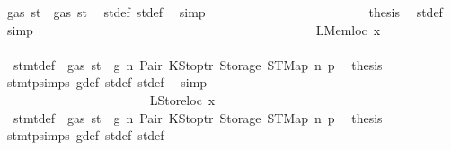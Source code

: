 \begin{isabellebody}
\ {\isachardoublequoteopen}gas\ st{\isacharprime}{\kern0pt}{\isacharprime}{\kern0pt}\ {\isasymle}\ gas\ st{\isacharprime}{\kern0pt}{\isachardoublequoteclose}\ \isamarkupfalse%
\ st{\isacharprime}{\kern0pt}{\isacharunderscore}{\kern0pt}def\ st{\isacharprime}{\kern0pt}{\isacharprime}{\kern0pt}{\isacharunderscore}{\kern0pt}def\ \isamarkupfalse%
\ simp\isanewline
\ \ \ \ \ \ \ \ \ \ \ \ \ \ \ \ \ \ \ \ \ \ \isamarkupfalse%
\ \isamarkupfalse%
\ {\isacharquery}{\kern0pt}thesis\ \isamarkupfalse%
\ st{\isacharprime}{\kern0pt}{\isacharunderscore}{\kern0pt}def\ \isamarkupfalse%
\ simp\isanewline
\ \ \ \ \ \ \ \ \ \ \ \ \ \ \ \ \ \ \ \ \isamarkupfalse%
\isanewline
\ \ \ \ \ \ \ \ \ \ \ \ \ \ \ \ \ \ \ \ \ \ \isamarkupfalse%
\ {\isacharparenleft}{\kern0pt}LMemloc\ x{}{\isacharparenright}{\kern0pt}\isanewline
\ \ \ \ \ \ \ \ \ \ \ \ \ \ \ \ \ \ \ \ \ \ \isamarkupfalse%
\ {}{\isacharparenleft}{\kern0pt}{}{\isacharparenright}{\kern0pt}\ stmt{\isacharunderscore}{\kern0pt}def\ {\isacharbackquoteopen}{\isasymnot}\ gas\ st\ {\isasymle}\ g{\isacharbackquoteclose}\ n\ Pair\ KStoptr\ Storage\ STMap\ n{}\ p{}\ \isamarkupfalse%
\ {\isacharquery}{\kern0pt}thesis\ \isamarkupfalse%
\ stmt{\isachardot}{\kern0pt}psimps{\isacharparenleft}{\kern0pt}{}{\isacharparenright}{\kern0pt}\ g{\isacharunderscore}{\kern0pt}def\ st{\isacharprime}{\kern0pt}{\isacharunderscore}{\kern0pt}def\ st{\isacharprime}{\kern0pt}{\isacharprime}{\kern0pt}{\isacharunderscore}{\kern0pt}def\ \isamarkupfalse%
\ simp\isanewline
\ \ \ \ \ \ \ \ \ \ \ \ \ \ \ \ \ \ \ \ \isamarkupfalse%
\isanewline
\ \ \ \ \ \ \ \ \ \ \ \ \ \ \ \ \ \ \ \ \ \ \isamarkupfalse%
\ {\isacharparenleft}{\kern0pt}LStoreloc\ x{}{\isacharparenright}{\kern0pt}\isanewline
\ \ \ \ \ \ \ \ \ \ \ \ \ \ \ \ \ \ \ \ \ \ \isamarkupfalse%
\ {}{\isacharparenleft}{\kern0pt}{}{\isacharparenright}{\kern0pt}\ stmt{\isacharunderscore}{\kern0pt}def\ {\isacharbackquoteopen}{\isasymnot}\ gas\ st\ {\isasymle}\ g{\isacharbackquoteclose}\ n\ Pair\ KStoptr\ Storage\ STMap\ n{}\ p{}\ \isamarkupfalse%
\ {\isacharquery}{\kern0pt}thesis\ \isamarkupfalse%
\ stmt{\isachardot}{\kern0pt}psimps{\isacharparenleft}{\kern0pt}{}{\isacharparenright}{\kern0pt}\ g{\isacharunderscore}{\kern0pt}def\ st{\isacharprime}{\kern0pt}{\isacharunderscore}{\kern0pt}def\ st{\isacharprime}{\kern0pt}{\isacharprime}{\kern0pt}{\isacharunderscore}{\kern0pt}def\ \isamarkupfalse%

\end{isabellebody}
